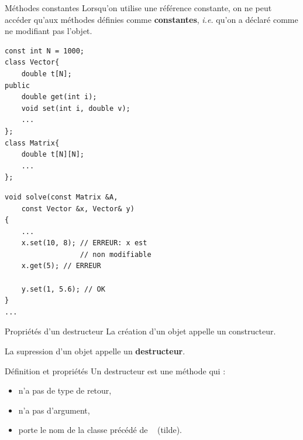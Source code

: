\begin{frame}[fragile=singleslide]{Méthodes constantes}
    Lorsqu'on utilise une référence constante, on ne peut accéder qu'aux méthodes définies comme \textbf{constantes}, \textit{i.e.} qu'on a déclaré comme ne modifiant pas l'objet.

    \begin{minipage}{0.44\linewidth}
            \begin{verbatim}
const int N = 1000;
class Vector{
    double t[N];
public
    double get(int i);
    void set(int i, double v);
    ...
};
class Matrix{
    double t[N][N];
    ...
};
            \end{verbatim}
    \end{minipage}
    \hfill
    \begin{minipage}{0.50\linewidth}       
            \begin{verbatim}
void solve(const Matrix &A,
    const Vector &x, Vector& y)
{
    ...
    x.set(10, 8); // ERREUR: x est
                  // non modifiable
    x.get(5); // ERREUR

    y.set(1, 5.6); // OK
}
...
            \end{verbatim}
    \end{minipage}
\end{frame}

\begin{frame}{Propriétés d'un destructeur}
    La création d'un objet appelle un constructeur.
    
    La supression d'un objet appelle un \textbf{destructeur}.

    \begin{block}{Définition et propriétés}
    Un destructeur est une méthode qui :
    \begin{itemize}
        \item n'a pas de type de retour,
        \item n'a pas d'argument,
        \item porte le nom de la classe précédé de \texttt{~} (tilde).
    \end{itemize}
    \end{block}
\end{frame}

